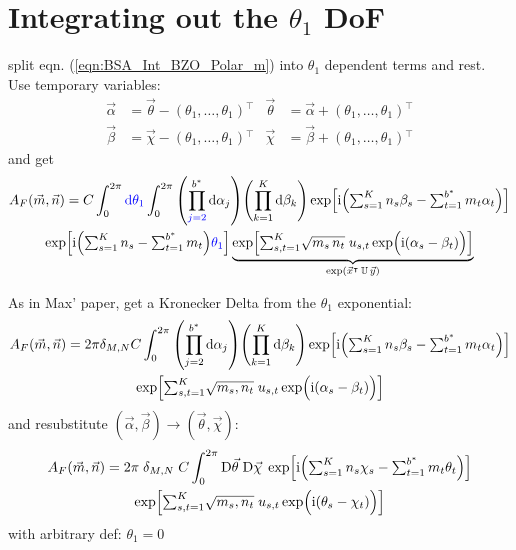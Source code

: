\documentclass[
	english,
	a4paper,
	fontsize=10pt,
	parskip=half,
	titlepage=true,
	DIV=12,
	final
]{scrreprt}
\newcommand*{\transp}{\ensuremath{^\intercal}}
\newcommand*{\iunit}{\ensuremath{\mathrm{i}}}
\newcommand*{\DD}[1]{\ensuremath{\text{D}\vec{#1}\;}}
\begin{document}
\section{Integrating out the $\theta_1$ DoF}
split eqn. (\ref{eqn:BSA_Int_BZO_Polar_m}) into $\theta_1$ dependent terms and rest. Use temporary variables:
\begin{align}
	\vec{\alpha} &= \vec{\theta} - (\theta_1, \ldots, \theta_1)\transp
	&
	\vec{\theta} &= \vec{\alpha} + (\theta_1, \ldots, \theta_1)\transp
\\
	\vec{\beta } &= \vec{\chi  } - (\theta_1, \ldots, \theta_1)\transp
	&
	\vec{\chi  } &= \vec{\beta } + (\theta_1, \ldots, \theta_1)\transp
\end{align}
and get
\begin{multline}
	A_F(\vec{m}, \vec{n})
=
	C
	\int_{0}^{2\pi} {\color{blue} \dd{\theta_1}}
	\int_{0}^{2\pi}
		\qty( \prod_{{\color{blue} j=2}}^{b^*} \dd{\alpha_j} )
		\qty( \prod_{k=1}               ^{K}   \dd{\beta_k} )
			\exp[
				\iunit \qty(
				{\textstyle \sum_{s=1}^{K}   n_s \beta _s}   -
				{\textstyle \sum_{t=1}^{b^*} m_t \alpha_t}
			)]
\\
	\exp[
		\iunit \qty(
			{\textstyle \sum_{s=1}^{K}   n_s}   -
			{\textstyle \sum_{t=1}^{b^*} m_t}
		)
		{\color{blue} \theta_1}
	]
	\underbrace{
	\exp[
		{\textstyle \sum_{s,t=1}^{K} }
			\sqrt{m_s \, n_t} \;
			u_{s,t}
			\exp(\Big. \iunit(\alpha_s - \beta_t) )
	]}_{\exp( \vec{x}\transp \, \mathbb{U} \, \vec{y})}
\end{multline}

As in Max' paper, get a Kronecker Delta from the $\theta_1$ exponential:
\begin{multline}	
	A_F(\vec{m}, \vec{n})
=
	2\pi \delta_{M,N} C
	\int_{0}^{2\pi}
		\qty( \prod_{j=2}^{b^*} \dd{\alpha_j} )
		\qty( \prod_{k=1}^{K}   \dd{\beta _k} )
	\exp[
		\iunit \qty(
		{\textstyle \sum_{s=1}^{K}   n_s \beta _s}   -
		{\textstyle \sum_{t=1}^{b^*} m_t \alpha_t}
	)]
\\
	\exp[
		{\textstyle \sum_{s,t=1}^{K} }
			\sqrt{m_s, n_t} \;
			u_{s,t}
			\exp(\Big. \iunit(\alpha_s - \beta_t) )
	]
\end{multline}
and resubstitute $(\vec{\alpha}, \vec{\beta}) \to (\vec{\theta}, \vec{\chi})$:
\begin{multline}	
	A_F(\vec{m}, \vec{n})
=
	2\pi \; \delta_{M,N} \; C
	\int_{0}^{2\pi}
		\DD{\theta} \DD{\chi}
	\exp[
		\iunit \qty(
		{\textstyle \sum_{s=1}^{K}   n_s \chi  _s}   -
		{\textstyle \sum_{t=1}^{b^*} m_t \theta_t}
	)]
\\
	\exp[
		{\textstyle \sum_{s,t=1}^{K} }
			\sqrt{m_s, n_t} \;
			u_{s,t}
			\exp(\Big. \iunit(\theta_s - \chi_t) )
	]
\end{multline}
with arbitrary def: $\theta_1 = 0$
\end{document}
